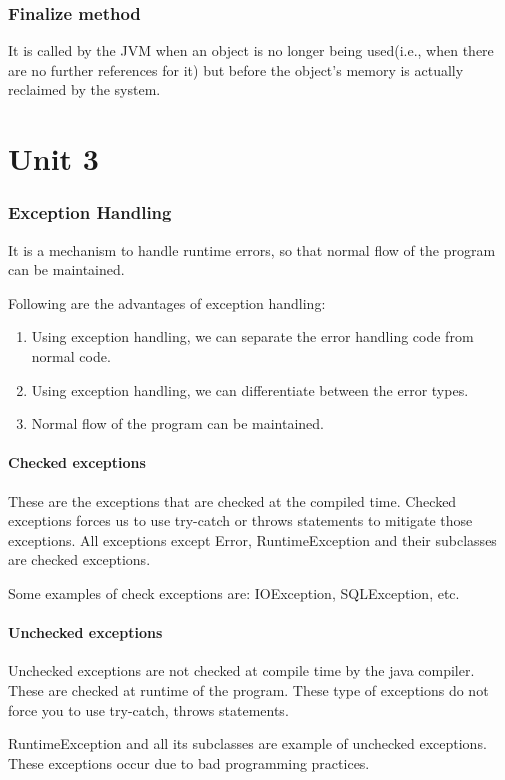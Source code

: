\documentclass[a4paper, 12pt]{scrarticle}
\begin{document}
\section{Finalize method}
It is called by the JVM when an object is no longer being used(i.e., when there are no further references for it) but before the object's memory is actually reclaimed by the system.

\newpage
\part{Unit 3}
\section{Exception Handling}
It is a mechanism to handle runtime errors, so that normal flow of the program can be maintained.

Following are the advantages of exception handling:
\begin{enumerate}
  \item Using exception handling, we can separate the error handling code from normal code.
  \item Using exception handling, we can differentiate between the error types.
  \item Normal flow of the program can be maintained.
\end{enumerate}

\subsection{Checked exceptions}
These are the exceptions that are checked at the compiled time. Checked exceptions forces us to use try-catch or throws statements to mitigate those exceptions. All exceptions except Error, RuntimeException and their subclasses are checked exceptions.

Some examples of check exceptions are: IOException, SQLException, etc.

\subsection{Unchecked exceptions}
Unchecked exceptions are not checked at compile time by the java compiler. These are checked at runtime of the program. These type of exceptions do not force you to use try-catch, throws statements. 

RuntimeException and all its subclasses are example of unchecked exceptions. These exceptions occur due to bad programming practices.
\end{document}
